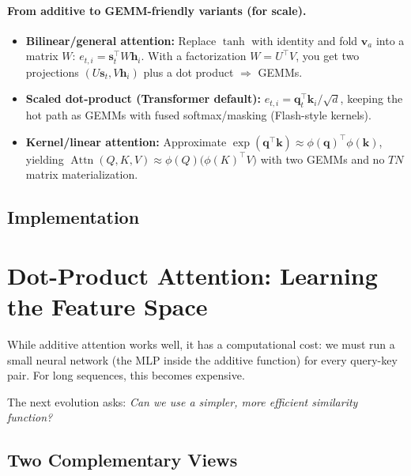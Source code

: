 \documentclass{article}
\begin{document}
\paragraph{From additive to GEMM-friendly variants (for scale).}
\begin{itemize}
  \item \textbf{Bilinear/general attention:} Replace \(\tanh\) with identity and fold \(\bm{v}_a\) into a matrix \(W\):
  \(e_{t,i}=\bm{s}_t^{\!\top}W\bm{h}_i\).
  With a factorization \(W=U^{\top}V\), you get two projections \((U\bm{s}_t, V\bm{h}_i)\) plus a dot product \(\Rightarrow\) GEMMs.
  \item \textbf{Scaled dot-product (Transformer default):} \(e_{t,i}=\bm{q}_t^{\!\top}\bm{k}_i/\sqrt{d}\), keeping the hot path as GEMMs with fused softmax/masking (Flash-style kernels).
  \item \textbf{Kernel/linear attention:} Approximate \(\exp(\bm{q}^{\top}\bm{k})\approx \phi(\bm{q})^{\top}\phi(\bm{k})\), yielding
  \(\operatorname{Attn}(Q,K,V)\approx \phi(Q)\big(\phi(K)^{\top}V\big)\) with two GEMMs and no \(TN\) matrix materialization.
\end{itemize}






\subsection{Implementation}


\section{Dot-Product Attention: Learning the Feature Space}
While additive attention works well, it has a computational cost: we must run a small neural network (the MLP inside the additive function) for every query-key pair. For long sequences, this becomes expensive.

The next evolution asks: \textit{Can we use a simpler, more efficient similarity function?}




\subsection{Two Complementary Views}
\end{document}
